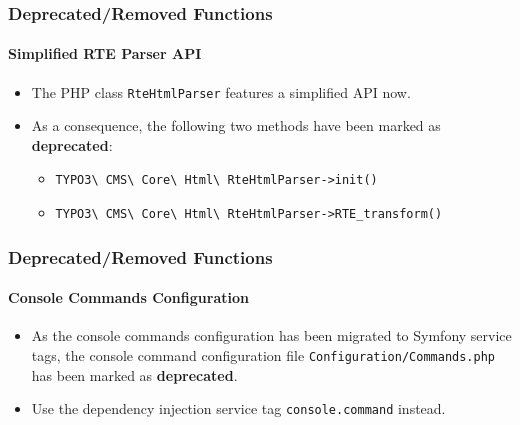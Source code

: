 
\begin{frame}[fragile]
	\frametitle{Deprecated/Removed Functions}
	\framesubtitle{Simplified RTE Parser API}

	\begin{itemize}
		\item The PHP class \texttt{RteHtmlParser} features a simplified API now.
		\item As a consequence, the following two methods have been marked as \textbf{deprecated}:

			\begin{itemize}
				\item \texttt{TYPO3\textbackslash
					CMS\textbackslash
					Core\textbackslash
					Html\textbackslash
					RteHtmlParser->init()}
				\item \texttt{TYPO3\textbackslash
					CMS\textbackslash
					Core\textbackslash
					Html\textbackslash
					RteHtmlParser->RTE\_transform()}
			\end{itemize}

	\end{itemize}

\end{frame}


\begin{frame}[fragile]
	\frametitle{Deprecated/Removed Functions}
	\framesubtitle{Console Commands Configuration}

	\begin{itemize}
		\item As the console commands configuration has been migrated to Symfony service tags,
			the console command configuration file \texttt{Configuration/Commands.php}
			has been marked as \textbf{deprecated}.
		\item Use the dependency injection service tag \texttt{console.command} instead.

	\end{itemize}

\end{frame}


